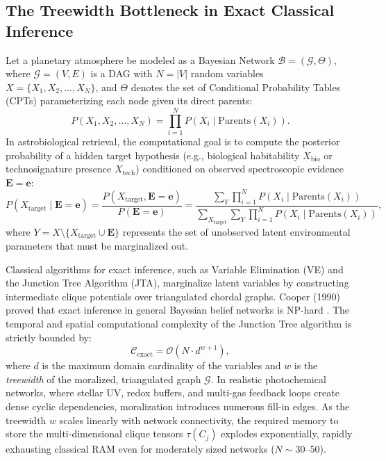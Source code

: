 \subsection{The Treewidth Bottleneck in Exact Classical Inference}
Let a planetary atmosphere be modeled as a Bayesian Network $\mathcal{B} = (\mathcal{G}, \Theta)$, where $\mathcal{G} = (V, E)$ is a DAG with $N = |V|$ random variables $X = \{X_1, X_2, \dots, X_N\}$, and $\Theta$ denotes the set of Conditional Probability Tables (CPTs) parameterizing each node given its direct parents:
\begin{equation}
P(X_1, X_2, \dots, X_N) = \prod_{i=1}^N P\left(X_i \mid \mathrm{Parents}(X_i)\right).
\label{eq:bn_factorization_ch1}
\end{equation}
In astrobiological retrieval, the computational goal is to compute the posterior probability of a hidden target hypothesis (e.g., biological habitability $X_{\mathrm{bio}}$ or technosignature presence $X_{\mathrm{tech}}$) conditioned on observed spectroscopic evidence $\mathbf{E} = \mathbf{e}$:
\begin{equation}
P(X_{\mathrm{target}} \mid \mathbf{E} = \mathbf{e}) = \frac{P(X_{\mathrm{target}}, \mathbf{E} = \mathbf{e})}{P(\mathbf{E} = \mathbf{e})} = \frac{\sum_{Y} \prod_{i=1}^N P\left(X_i \mid \mathrm{Parents}(X_i)\right)}{\sum_{X_{\mathrm{target}}} \sum_{Y} \prod_{i=1}^N P\left(X_i \mid \mathrm{Parents}(X_i)\right)},
\label{eq:exact_marginalization_ch1}
\end{equation}
where $Y = X \setminus \{X_{\mathrm{target}} \cup \mathbf{E}\}$ represents the set of unobserved latent environmental parameters that must be marginalized out.

Classical algorithms for exact inference, such as Variable Elimination (VE) and the Junction Tree Algorithm (JTA), marginalize latent variables by constructing intermediate clique potentials over triangulated chordal graphs. Cooper (1990) proved that exact inference in general Bayesian belief networks is NP-hard \cite{cooper1990}. The temporal and spatial computational complexity of the Junction Tree algorithm is strictly bounded by:
\begin{equation}
\mathcal{C}_{\mathrm{exact}} = \mathcal{O}\left(N \cdot d^{w+1}\right),
\label{eq:treewidth_bound_ch1}
\end{equation}
where $d$ is the maximum domain cardinality of the variables and $w$ is the \emph{treewidth} of the moralized, triangulated graph $\mathcal{G}$. In realistic photochemical networks, where stellar UV, redox buffers, and multi-gas feedback loops create dense cyclic dependencies, moralization introduces numerous fill-in edges. As the treewidth $w$ scales linearly with network connectivity, the required memory to store the multi-dimensional clique tensors $\tau(C_j)$ explodes exponentially, rapidly exhausting classical RAM even for moderately sized networks ($N \sim 30$--$50$).

